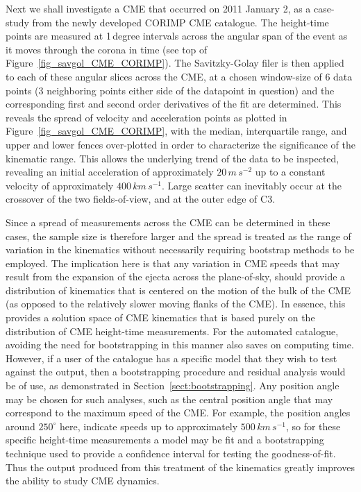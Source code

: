 \documentclass[structabstract]{aa}
\begin{document}
Next we shall investigate a CME that occurred on 2011 January 2, as a case-study from the newly developed CORIMP CME catalogue. The height-time points are measured at 1\,degree intervals across the angular span of the event as it moves through the corona in time (see top of Figure~\ref{fig_savgol_CME_CORIMP}). The Savitzky-Golay filer is then applied to each of these angular slices across the CME, at a chosen window-size of 6 data points (3 neighboring points either side of the datapoint in question) and the corresponding first and second order derivatives of the fit are determined. This reveals the spread of velocity and acceleration points as plotted in Figure~\ref{fig_savgol_CME_CORIMP}, with the median, interquartile range, and upper and lower fences over-plotted in order to characterize the significance of the kinematic range. This allows the underlying trend of the data to be inspected, revealing an initial acceleration of approximately $20\,m\,s^{-2}$ up to a constant velocity of approximately $400\,km\,s^{-1}$. Large scatter can inevitably occur at the crossover of the two fields-of-view, and at the outer edge of C3.

Since a spread of measurements across the CME can be determined in these cases, the sample size is therefore larger and the spread is treated as the range of variation in the kinematics without necessarily requiring bootstrap methods to be employed. The implication here is that any variation in CME speeds that may result from the expansion of the ejecta across the plane-of-sky, should provide a distribution of kinematics that is centered on the motion of the bulk of the CME (as opposed to the relatively slower moving flanks of the CME). In essence, this provides a solution space of CME kinematics that is based purely on the distribution of CME height-time measurements. For the automated catalogue, avoiding the need for bootstrapping in this manner also saves on computing time. However, if a user of the catalogue has a specific model that they wish to test against the output, then a bootstrapping procedure and residual analysis would be of use, as demonstrated in Section~\ref{sect:bootstrapping}. Any position angle may be chosen for such analyses, such as the central position angle that may correspond to the maximum speed of the CME. For example, the position angles around $250^{\circ}$ here, indicate speeds up to approximately $500\,km\,s^{-1}$, so for these specific height-time measurements a model may be fit and a bootstrapping technique used to provide a confidence interval for testing the goodness-of-fit. Thus the output produced from this treatment of the kinematics greatly improves the ability to study CME dynamics.
\end{document}

